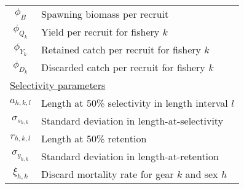 \documentclass[12pt,letterpaper]{article}
\begin{document}
\begin{table}
\begin{tabular}{cl}
      $\phi_B$    & Spawning biomass per recruit \\
      $\phi_{Q_k}$& Yield per recruit for fishery $k$\\
      $\phi_{Y_k}$& Retained catch per recruit for fishery $k$ \\
      $\phi_{D_k}$& Discarded catch per recruit for fishery $k$ \\
  \multicolumn{2}{l}{\underline{Selectivity parameters}} \\
      $a_{h,k,l}$ & Length at 50\% selectivity in length interval $l$\\
      $\sigma_{s_{h,k}}$ & Standard deviation in length-at-selectivity\\
      $r_{h,k,l}$ & Length at 50\% retention\\
      $\sigma_{y_{h,k}}$ & Standard deviation in length-at-retention\\
      $\xi_{h,k}$ & Discard mortality rate for gear $k$ and sex $h$\\
  \hline
  \end{tabular}
\end{table}


  


  


  
  
\end{document}
